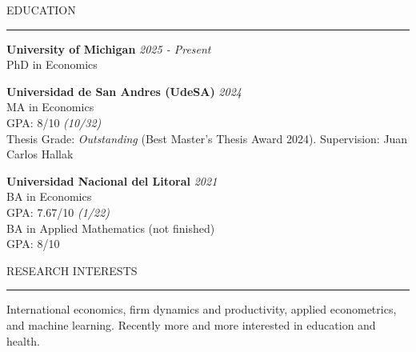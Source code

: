 \documentclass{resume} %
\renewenvironment{rSection}[1]{
\sectionskip
\textcolor{CustomRed}{\MakeUppercase{#1}}
\sectionlineskip
\hrule
\begin{list}{}{
\setlength{\leftmargin}{1.5em}
}
\item[]
}{
\end{list}
}
\begin{document}
\vspace{-0.3cm}
\begin{rSection}{Education}
{\bf University of Michigan} \hfill {\em 2025 - Present}
\\ PhD in Economics

{\bf Universidad de San Andres (UdeSA)} \hfill {\em 2024}
\\ MA in Economics
\\ GPA: 8/10 \textit{(10/32)} \hfill
\\ Thesis Grade: \textit{Outstanding} (Best Master's Thesis Award 2024). Supervision: Juan Carlos Hallak

{\bf Universidad Nacional del Litoral} \hfill {\em 2021}
\\ BA in Economics
\\ GPA: 7.67/10 \textit{(1/22)}
\\ BA in Applied Mathematics (not finished)
\\ GPA: 8/10
\hfill
\end{rSection}

\vspace{-0.3cm}
\begin{rSection}{Research Interests}
International economics, firm dynamics and productivity, applied econometrics, and machine learning. Recently more and more interested in education and health.
\end{rSection}
\end{document}
